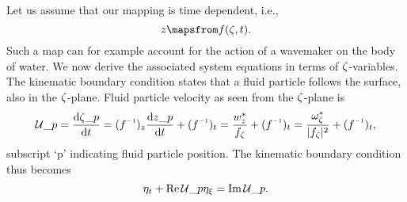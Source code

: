 %
%
%
%
%
%










Let us assume that our mapping is time dependent, i.e.,
\begin{equation}
z \mapsfrom f(\zz,t).
\label{eq:}
\end{equation}
Such a map can for example account for the action of a wavemaker on the body of water.
We now derive the associated system equations in terms of $\zeta$-variables.
The kinematic boundary condition states that a fluid particle follows the surface, also in the $\zeta$-plane. 
Fluid particle velocity as seen from the $\zeta$-plane is
\[
\mc U\_p = \ddfrac{\zz\_p}{t} = (\zzmap)_z \ddfrac{\z\_p}{t} + (\zzmap)_t = \frac{\w_z^*}{\zmap_\zz} + (\zzmap)_t =  \frac{\ww_\zz^*}{|\zmap_\zz|^2} + (\zzmap)_t,
\]
subscript `p' indicating fluid particle position.
The kinematic boundary condition thus becomes
\begin{equation}
\eta_t + \operatorname{Re} \mathcal U\_p \eta_\xi = \operatorname{Im} \mathcal U\_p.
\label{eq:BC_kin_transient}
\end{equation}

